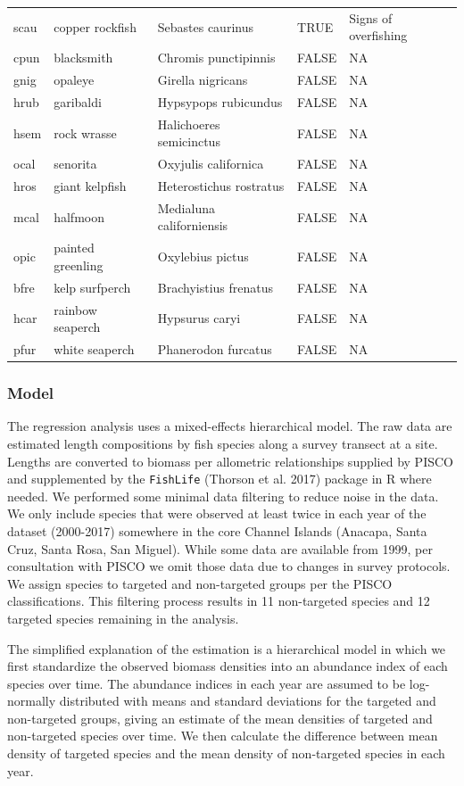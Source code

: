 \documentclass[]{article}
\begin{document}
\begin{longtable}[t]{lllll}
scau & copper rockfish & Sebastes caurinus & TRUE & Signs of overfishing\\
cpun & blacksmith & Chromis punctipinnis & FALSE & NA\\
gnig & opaleye & Girella nigricans & FALSE & NA\\
hrub & garibaldi & Hypsypops rubicundus & FALSE & NA\\
\addlinespace
hsem & rock wrasse & Halichoeres semicinctus & FALSE & NA\\
ocal & senorita & Oxyjulis californica & FALSE & NA\\
hros & giant kelpfish & Heterostichus rostratus & FALSE & NA\\
mcal & halfmoon & Medialuna californiensis & FALSE & NA\\
opic & painted greenling & Oxylebius pictus & FALSE & NA\\
\addlinespace
bfre & kelp surfperch & Brachyistius frenatus & FALSE & NA\\
hcar & rainbow seaperch & Hypsurus caryi & FALSE & NA\\
pfur & white seaperch & Phanerodon furcatus & FALSE & NA\\*
\end{longtable}

\hypertarget{model}{%
\subsubsection{Model}\label{model}}

The regression analysis uses a mixed-effects hierarchical model. The raw data are estimated length compositions by fish species along a survey transect at a site. Lengths are converted to biomass per allometric relationships supplied by PISCO and supplemented by the \texttt{FishLife} (Thorson et al. 2017) package in R where needed. We performed some minimal data filtering to reduce noise in the data. We only include species that were observed at least twice in each year of the dataset (2000-2017) somewhere in the core Channel Islands (Anacapa, Santa Cruz, Santa Rosa, San Miguel). While some data are available from 1999, per consultation with PISCO we omit those data due to changes in survey protocols. We assign species to targeted and non-targeted groups per the PISCO classifications. This filtering process results in 11 non-targeted species and 12 targeted species remaining in the analysis.

The simplified explanation of the estimation is a hierarchical model in which we first standardize the observed biomass densities into an abundance index of each species over time. The abundance indices in each year are assumed to be log-normally distributed with means and standard deviations for the targeted and non-targeted groups, giving an estimate of the mean densities of targeted and non-targeted species over time. We then calculate the difference between mean density of targeted species and the mean density of non-targeted species in each year.
\end{document}

